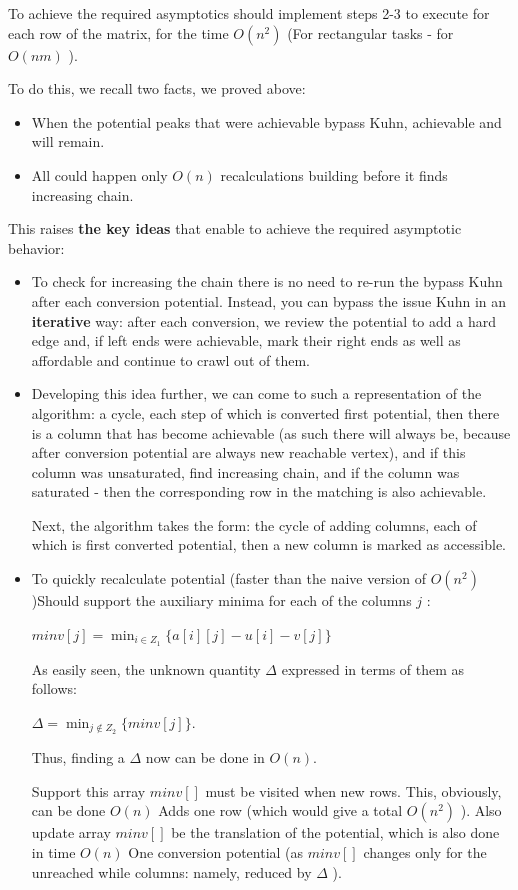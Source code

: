 To achieve the required asymptotics should implement steps 2-3 to execute for each row of the matrix, for the time $O (n ^ 2)$ (For rectangular tasks - for $O (n m)$ ).

To do this, we recall two facts, we proved above:

\begin{itemize}

\item When the potential peaks that were achievable bypass Kuhn, achievable and will remain.

\item All could happen only $O (n)$ recalculations building before it finds increasing chain.

\end{itemize}

This raises \textbf{the key ideas} that enable to achieve the required asymptotic behavior:

\begin{itemize}

\item To check for increasing the chain there is no need to re-run the bypass Kuhn after each conversion potential. Instead, you can bypass the issue Kuhn in an \textbf{iterative} way: after each conversion, we review the potential to add a hard edge and, if left ends were achievable, mark their right ends as well as affordable and continue to crawl out of them.

\item Developing this idea further, we can come to such a representation of the algorithm: a cycle, each step of which is converted first potential, then there is a column that has become achievable (as such there will always be, because after conversion potential are always new reachable vertex), and if this column was unsaturated, find increasing chain, and if the column was saturated - then the corresponding row in the matching is also achievable.

Next, the algorithm takes the form: the cycle of adding columns, each of which is first converted potential, then a new column is marked as accessible.

\item To quickly recalculate potential (faster than the naive version of $O (n ^ 2)$)Should support the auxiliary minima for each of the columns $j$ :

$minv[j]=\min_{i\in Z_{1}}\{a[i][j]-u[i]-v[j]\}$

As easily seen, the unknown quantity $\Delta$ expressed in terms of them as follows:

$\Delta = \min_ {j \notin Z_2} \{minv [j] \}.$

Thus, finding a $\Delta$ now can be done in $O (n)$.

Support this array $minv []$ must be visited when new rows. This, obviously, can be done $O (n)$ Adds one row (which would give a total $O (n ^ 2)$ ). Also update array $minv []$ be the translation of the potential, which is also done in time $O (n)$ One conversion potential (as $minv []$ changes only for the unreached while columns: namely, reduced by $\Delta$ ).

\end{itemize}

